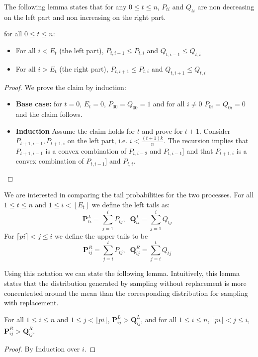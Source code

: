 The following lemma states that for any $0 \leq t \leq n$,
$P_{ti}$ and $Q_{ti}$ are non decreasing on the left part and non
increasing on the right part.
\begin{lemma}
  for all $0 \leq t \leq n$:
  \begin{itemize}
  \item For all $i< E_t$ (the left part), $P_{t,i-1} \leq P_{t,i}$ and
    $Q_{t,i-1} \leq Q_{t,i}$
  \item For all $i>E_t$ (the right part), $P_{t,i+1} \leq P_{t,i}$ and
    $Q_{t,i+1} \leq Q_{t,i}$
  \end{itemize}
\end{lemma}
\begin{proof}
  We prove the claim by induction:
  \begin{itemize}
    \item {\bf Base case:} for $t=0$, $E_t=0$, $P_{00}=Q_{00}=1$ and
      for all $i\neq 0$ $P_{0i}=Q_{0i}=0$ and the claim follows.
    \item {\bf Induction} Assume the claim holds for $t$ and prove for
      $t+1$. Consider $P_{t+1,i-1},P_{t+1,i}$ on the left
      part, i.e. $i < \frac{(t+1)k}{n}$. The recursion
      implies that $P_{t+1,i-1}$ is a convex combination of 
      $P_{t,i-2}$ and $P_{t,i-1}]$ and that $P_{t+1,i}$ is a convex
        combination of $P_{t,i-1}]$ and $P_{t,i}$. 
    \end{itemize}
\end{proof}

\newcommand{\Pupper}{{\mathbf P}^{R}}
\newcommand{\Plower}{{\mathbf P}^{L}}
\newcommand{\Qupper}{{\mathbf Q}^{R}}
\newcommand{\Qlower}{{\mathbf Q}^{L}}

We are interested in comparing the tail probabilities for the two
processes. For all $1 \leq t \leq n$ and $1 \leq i < \left\lfloor
E_t\right\rfloor $ we define the left tails as:
\[
\Plower_{ti} = \sum_{j=1}^i P_{tj},\;\;
\Qlower_{ti} = \sum_{j=1}^i Q_{tj}\;\;
\]
For $\lceil pi \rceil < j \leq i$ we define the upper tails to be
\[
\Pupper_{ij} = \sum_{j=i}^t P_{tj},\;\;
\Qupper_{ij} = \sum_{j=i}^t Q_{tj}\;\;
\]

Using this notation we can state the following lemma. Intuitively,
this lemma states that the distribution generated by sampling without
replacement is more concentrated around the mean than the
corresponding distribution for sampling with replacement.
\begin{lemma}
For all $1 \leq i \leq n$ and $1 \leq j < \lfloor pi \rfloor$,
$\Plower_{ij} > \Qlower_{ij}$, and for all $1 \leq i \leq n$, $\lceil
pi \rceil < j \leq i$, $\Pupper_{ij} > \Qupper_{ij}$.
\end{lemma}
\begin{proof}
  By Induction over $i$.
  \end{proof}
